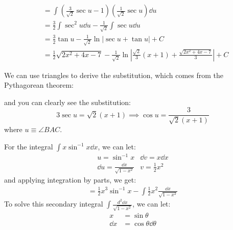 \begin{itemize}
\begin{example}
\begin{align}
            &= \int \left(\frac{3}{\sqrt{2}}\sec u -1\right)\left(\frac{1}{\sqrt{2}}\sec u\right) \dd{u} \\ 
            &= \frac{3}{2}\int \sec^2 u \dd{u} - \frac{1}{\sqrt{2}}\int \sec u \dd{u} \\ 
            &= \frac{3}{2}\tan u - \frac{1}{\sqrt{2}}\ln|\sec u + \tan u| + C \\
            &= \frac{1}{2}\sqrt{2x^2+4x-7} - \frac{1}{\sqrt{2}}\ln\left|\frac{\sqrt{2}}{3}(x+1)+\frac{\sqrt{2x^2+4x-7}}{3}\right| + C
        \end{align}
    \end{example}
    \begin{idea}
        We can use triangles to derive the substitution, which comes from the Pythagorean theorem:
        \begin{center}
        \end{center}
        and you can clearly see the substitution:
        \begin{equation}
            3\sec u = \sqrt{2}(x+1) \implies \cos u = \frac{3}{\sqrt{2} (x+1)}
        \end{equation}
        where $u \equiv \angle BAC$.
    \end{idea}
    \begin{example}
        For the integral $\int x \sin^{-1} x \dd{x}$, we can let:
        \begin{align}
            u = \sin^{-1} x & \dd{v} = x \dd{x} \\
            \dd{u} = \frac{\dd{x}}{\sqrt{1-x^2}} & v = \frac{1}{2}x^2 
        \end{align}
        and applying integration by parts, we get:
        \begin{align}
            =\frac{1}{2}x^3 \sin^{-1} x - \int \frac{1}{2}x^2 \frac{\dd{x}}{\sqrt{1-x^2}}
        \end{align}
        To solve this secondary integral $\int \frac{d^2 \dd{x}}{\sqrt{1-x^2}}$, we can let:
        \begin{align}
            x &= \sin\theta \\ 
            \dd{x} &= \cos \theta \dd{\theta} \\ 

\end{align}
\end{example}
\end{itemize}
